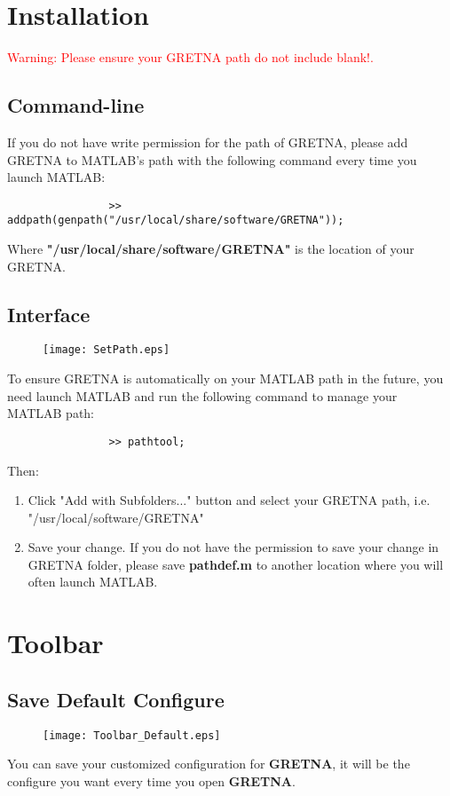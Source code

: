 \documentclass[11pt]{article}
\begin{document}
	\section{Installation}
		\textcolor{red}{Warning: Please ensure your GRETNA path do not include blank!.}
		\subsection{Command-line}
			If you do not have write permission for the path of GRETNA, 
			please add GRETNA to MATLAB's path with the following command every time you launch MATLAB:
			\begin{lstlisting}
				>> addpath(genpath("/usr/local/share/software/GRETNA"));
			\end{lstlisting}
			Where \textbf{"/usr/local/share/software/GRETNA"} is the location of your GRETNA.
		\subsection{Interface}
			\begin{figure}
				\begin{center}
					\texttt{[image: SetPath.eps]}
				\end{center}
			\end{figure}
			To ensure GRETNA is automatically on your MATLAB path in the future, 
			you need launch MATLAB and run the following command to manage your MATLAB path: 
			\begin{lstlisting}
				>> pathtool;
			\end{lstlisting}
			Then:
			\begin{enumerate}
				\item Click "Add with Subfolders..." button and 
					select your GRETNA path, i.e. "/usr/local/software/GRETNA"
				\item Save your change. If you do not have the permission to save your change in GRETNA folder, 
					please save \textbf{pathdef.m} to another location where you will often launch MATLAB.
			\end{enumerate}
	\section{Toolbar}
		\subsection{Save Default Configure}
			\begin{figure}
				\begin{center}
					\texttt{[image: Toolbar\_Default.eps]}
				\end{center}
			\end{figure}
			You can save your customized configuration for \textbf{GRETNA}, 
			it will be the configure you want every time you open \textbf{GRETNA}.
\end{document}
